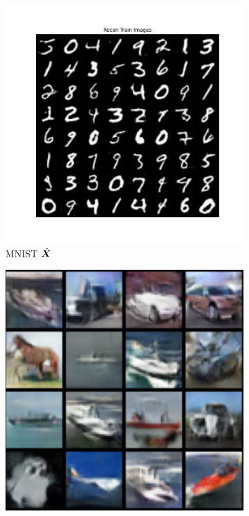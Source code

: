 \documentclass[../../book-main.tex]{subfiles}
\begin{document}
\begin{figure}[t]
    \begin{subfigure}[t]{0.3\textwidth}
        \centering
        \includegraphics[width=\textwidth]{figs_chap6/MNIST_MNIST_train_recon_images_epoch200_multi.png}
        \caption{{\small MNIST $\hat{\bm{X}}$}}
    \end{subfigure}
    \hfill
    \begin{subfigure}[t]{0.3\textwidth}
        \centering
        \includegraphics[width=\textwidth]{figs_chap6/cifar_reconstruct.png}

\end{subfigure}
\end{figure}
\end{document}
